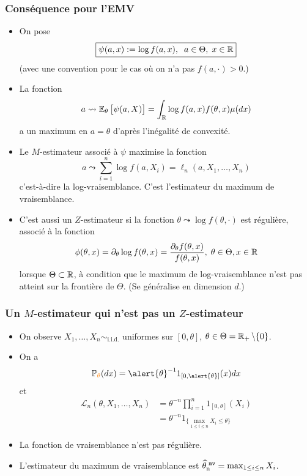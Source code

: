 \begin{frame}
\frametitle{Conséquence pour l'EMV}
\begin{itemize}
\item On pose
$$\boxed{\psi(a,x):=\log f(a,x),\;\;a \in \Theta,\;x\in\operatorname{{\mathbb R}}}$$
(avec une convention pour le cas où on n'a pas $f(a,\cdot) >0$.)
\item La fonction
$$a \leadsto \operatorname{{\mathbb E}}_\theta \big[\psi(a,X)\big]=\int_{\operatorname{{\mathbb R}}}\log f(a,x) f(\theta,x) \mu(dx)$$
a un maximum en $a=\theta$ d'après \alert{l'inégalité de convexité}.
\end{itemize}
\end{frame}

\begin{frame}
\begin{itemize}
\item Le $M$-estimateur associé à $\psi$ maximise la fonction
$$a \leadsto \sum_{i = 1}^n \log f(a, X_i) = \ell_n(a, X_1,\ldots, X_n)$$
c'est-à-dire la \alert{ log-vraisemblance}. C'est \alert{l'estimateur du maximum de vraisemblance}.

\item C'est aussi un $Z$-estimateur si la fonction $\theta \leadsto \log f(\theta, \cdot)$ est régulière, associé à la fonction
$$\phi(\theta, x) = \partial_\theta \log f(\theta, x) = \frac{\partial_\theta f(\theta, x)}{f(\theta, x)},\;\theta \in \Theta, x\in \operatorname{{\mathbb R}}$$
lorsque $\Theta \subset \operatorname{{\mathbb R}}$, \`a condition que le maximum de
log-vraisemblance n'est pas atteint sur la fronti\`ere de $\Theta$.
(Se généralise en dimension $d$.)
\end{itemize}
\end{frame}


\begin{frame}
\frametitle{Un $M$-estimateur qui n'est pas un $Z$-estimateur}
\begin{itemize}
\item On observe $X_1,\ldots, X_n\sim_{\text{i.i.d}.}$ uniformes sur $[0,\theta]$, $\theta \in \Theta = \operatorname{{\mathbb R}}_+\setminus \{0\}$.
\item On a $$\PP_{\tco{\theta}}(dx) = \alert{\theta}^{-1}1_{[0,\alert{\theta}]}(x)dx$$
et
\begin{align*}
{\mathcal L}_n(\theta, X_1,\ldots, X_n)& = \theta^{-n}\prod_{i = 1}^n 1_{[0,\theta]}(X_i) \\
& = \theta^{-n}1_{\{\max_{1 \leq i \leq n} X_i \leq \theta\}}
\end{align*}
\item La fonction de vraisemblance \alert{n'est pas régulière}.
\item \alert{L'estimateur du maximum de vraisemblance est}
$\operatorname{\widehat \theta_n^{\,\,{\tt mv}}} = \max_{1 \leq i \leq n}X_i$. %
\end{itemize}
\end{frame}










